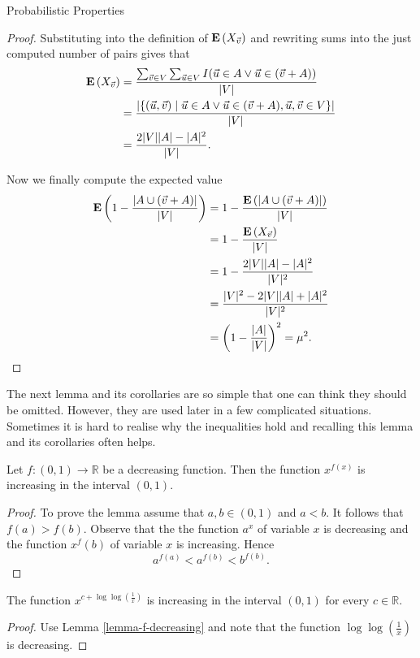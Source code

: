 \begin{section}{Probabilistic Properties}
\begin{lemma}
\begin{proof}
Substituting into the definition of $\mathbf{E}\left(X_{\vec{v}}\right)$ and rewriting sums into the just computed number of pairs gives that
\[
\begin{split}
\mathbf{E}\left(X_{\vec{v}}\right) 
	& = \frac{\sum_{\vec{v} \in V} \sum_{\vec{u} \in V} I(\vec{u} \in A \vee \vec{u} \in (\vec{v} + A))}{|V|}  \\
	& = \frac{|\{(\vec{u}, \vec{v}) \mid \vec{u} \in A \vee \vec{u} \in (\vec{v} + A), \vec{u}, \vec{v} \in V \}|}{|V|} \\ 
	& = \frac{2|V||A| - |A|^2}{|V|} \text{.}
\end{split}
\]

Now we finally compute the expected value
\[
\begin{split}
\mathbf{E}\left(1 - \frac{|A \cup (\vec{v} + A)|}{|V|}\right) 
	& = 1 - \frac{\mathbf{E}\left(|A \cup (\vec{v} + A)|\right)}{|V|}  \\
	& = 1 - \frac{\mathbf{E}\left(X_{\vec{v}}\right)}{|V|} \\
	& = 1 - \frac{2|V||A| - |A|^2}{|V|^2} \\
	& = \frac{|V|^2 - 2|V||A| + |A|^2}{|V|^2} \\
	& = \left(1 - \frac{|A|}{|V|}\right)^2 = \mu^2 \text{.}
\end{split}
\]
\end{proof}
\end{lemma}

The next lemma and its corollaries are so simple that one can think they should be omitted. However, they are used later in a few complicated situations. Sometimes it is hard to realise why the inequalities hold and recalling this lemma and its corollaries often helps.
\begin{lemma}
\label{lemma-f-decreasing}
Let $f: (0, 1) \rightarrow \mathbb{R}$ be a decreasing function. Then the function $x ^ {f(x)}$ is increasing in the interval $(0, 1)$.
\end{lemma}
\begin{proof}
To prove the lemma assume that $a, b \in (0, 1)$ and $a < b$. It follows that $f(a) > f(b)$. Observe that the the function $a ^ x$ of variable $x$ is decreasing and the function $x ^ f(b)$ of variable $x$ is increasing. Hence
\[
a ^ {f(a)} < a ^ {f(b)} < b ^ {f(b)} \text{.}
\]
\end{proof}

\begin{corollary}
\label{corollary-f0}
The function $x ^ {c + \log \log \left(\frac{1}{x}\right)}$ is increasing in the interval $(0, 1)$ for every $c \in \mathbb{R}$.
\end{corollary}
\begin{proof}
Use Lemma \ref{lemma-f-decreasing} and note that the function $\log \log \left(\frac{1}{x}\right)$ is decreasing.
\end{proof}


\end{section}
